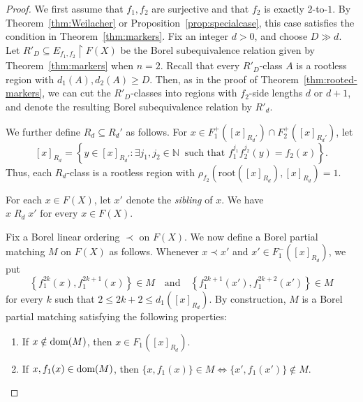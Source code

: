 \documentclass[11pt, reqno, a4paper]{amsart}
\theoremstyle{definition}
\theoremstyle{plain}
\newcommand{\dom}{\text{\rm dom}}
\begin{document}
\begin{proof}

We first assume that $f_1, f_2$ are surjective and that $f_2$ is exactly $2$-to-$1$. By Theorem~\ref{thm:Weilacher} or Proposition~\ref{prop:specialcase}, this case satisfies the condition in Theorem~\ref{thm:markers}.
Fix an integer $d>0$, and choose $D\gg d$.
Let
$R'_D\subseteq E_{f_1,f_2}\upharpoonright F(X)$
be the Borel subequivalence relation given by Theorem~\ref{thm:markers} when $n=2$. Recall that every $R'_D$-class $A$ is a rootless region with $d_1(A),d_2(A)\ge D$. Then, as in the proof of Theorem~\ref{thm:rooted-markers}, we can cut the $R'_D$-classes into regions with $f_2$-side lengths $d$ or $d+1$, and denote the resulting Borel subequivalence relation by $R'_d$. 

We further define $R_d\subseteq R_d'$ as follows. For $x\in F_1^+([x]_{R_d'})\cap F_2^+([x]_{R_d'})$, let 
$$[x]_{R_d}=\left\{y\in [x]_{R_d'}:\exists j_1,j_2\in\mathbb{N}\ \mbox{ such that } f_1^{j_1}f_2^{j_2}(y)=f_2(x)\right\}.$$
Thus, each $R_d$-class is a rootless region with $\rho_{f_2}(\mathrm{root}([x]_{R_d}),[x]_{R_d})=1$.

For each $x\in F(X)$, let $x'$ denote the \emph{sibling} of $x$. 
We have
$x\;R_d\;x'\text{ for every }x\in F(X)$. 

Fix a Borel linear ordering $\prec$ on $F(X)$. We now define a Borel partial matching $M$ on $F(X)$ as follows.
Whenever
$x\prec x'$ and
$x'\in F_1^-([x]_{R_d})$,
we put
$$
\left\{f_1^{2k}(x),f_1^{2k+1}(x)\right\}\in M
\quad\text{and}\quad
\left\{f_1^{2k+1}(x'),f_1^{2k+2}(x')\right\}\in M
$$
for every $k$ such that $2\le 2k+2\le d_1([x]_{R_d})$.
By construction, $M$ is a Borel partial matching satisfying the following properties:
\begin{enumerate}[label=\roman*),leftmargin=2.7em]
\item If $x\notin\dom(M)$, then $x\in F_1([x]_{R_d})$.
\item If $x,f_1(x)\in\dom(M)$, then
$
\{x,f_1(x)\}\in M
\iff
\{x',f_1(x')\}\notin M.$


\end{enumerate}
\end{proof}
\end{document}
